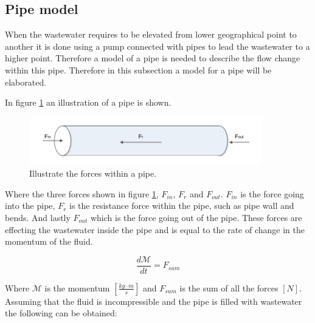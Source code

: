 
\subsection{Pipe model}\label{se:pipe_model}
When the wastewater requires to be elevated from lower geographical point to another it is done using a pump connected with pipes to lead the wastewater to a higher point. Therefore a model of a pipe is needed to describe the flow change within this pipe. Therefore in this subsection a model for a pipe will be elaborated. 

In figure \ref{fig:pipe_3d} an illustration of a pipe is shown.
\begin{figure}[H]
\centering
\includegraphics[width=0.9\textwidth]{report/modeling/pictures/pipe_3d.pdf}
\caption{Illustrate the forces within a pipe.}
\label{fig:pipe_3d}
\end{figure}

Where the three forces shown in figure \ref{fig:pipe_3d}, $F_{in}$, $F_r$ and $F_{out}$. $F_{in}$ is the force going into the pipe, $F_r$ is the resistance force within the pipe, such as pipe wall and bends. And lastly $F_{out}$ which is the force going out of the pipe. These forces are effecting the wastewater inside the pipe and is equal to the rate of change in the momentum of the fluid. 

\begin{equation}
	\frac{d\mathcal{M}}{dt}=F_{sum}
\end{equation}

Where $\mathcal{M}$ is the momentum $\left[\frac{kg\cdot m}{s}\right]$ and $F_{sum}$ is the sum of all the forces $[N]$. Assuming that the fluid is incompressible and the pipe is filled with wastewater the following can be obtained: 

